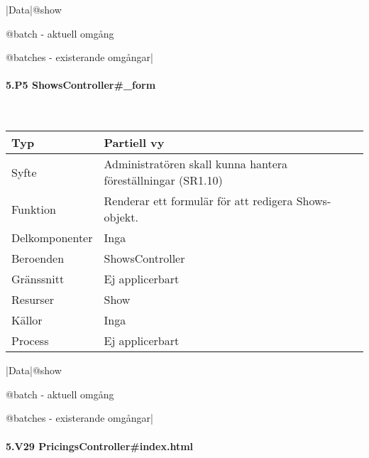 \documentclass[a4paper, twoside, 11pt, titlepage]{article}
\begin{document}
			|Data|@show

			@batch - aktuell omgång

			@batches - existerande omgångar|

			\paragraph{5.P5 ShowsController\#\_form}\

			\begin {table} [ht] \begin{tabular} {  p{3.5cm} p{9.6cm} }
				\hline
				Typ & Partiell vy  \\
				\hline
				Syfte & Administratören skall kunna hantera föreställningar (SR1.10)  \\
				\hline
				Funktion & Renderar ett formulär för att redigera Shows-objekt.  \\
				\hline
				Delkomponenter & Inga  \\
				\hline
				Beroenden & ShowsController  \\
				\hline
				Gränssnitt & Ej applicerbart  \\
				\hline
				Resurser & Show  \\
				\hline
				Källor & Inga  \\
				\hline
				Process & Ej applicerbart  \\
				\hline
			\end{tabular} \end{table} \FloatBarrier
			\vspace{6mm}

			|Data|@show

			@batch - aktuell omgång

			@batches - existerande omgångar|

			\paragraph{5.V29 PricingsController\#index.html}\
\end{document}
